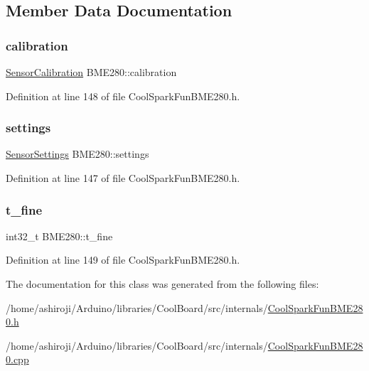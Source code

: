 \subsection{Member Data Documentation}
\mbox{\label{class_b_m_e280_aa7a28484b6f5eb6f43261ea25016fbf8}} 
\subsubsection{\texorpdfstring{calibration}{calibration}}
{\footnotesize\ttfamily \hyperlink{struct_sensor_calibration}{Sensor\+Calibration} B\+M\+E280\+::calibration}



Definition at line 148 of file Cool\+Spark\+Fun\+B\+M\+E280.\+h.

\mbox{\label{class_b_m_e280_af06253eb2f8ad4b5fabb858bc4a973bf}} 
\subsubsection{\texorpdfstring{settings}{settings}}
{\footnotesize\ttfamily \hyperlink{struct_sensor_settings}{Sensor\+Settings} B\+M\+E280\+::settings}



Definition at line 147 of file Cool\+Spark\+Fun\+B\+M\+E280.\+h.

\mbox{\label{class_b_m_e280_ad20f44914b78395f4d4bc64f4a68b369}} 
\subsubsection{\texorpdfstring{t\+\_\+fine}{t\_fine}}
{\footnotesize\ttfamily int32\+\_\+t B\+M\+E280\+::t\+\_\+fine}



Definition at line 149 of file Cool\+Spark\+Fun\+B\+M\+E280.\+h.



The documentation for this class was generated from the following files\+:\begin{DoxyCompactItemize}
\item 
/home/ashiroji/\+Arduino/libraries/\+Cool\+Board/src/internals/\hyperlink{_cool_spark_fun_b_m_e280_8h}{Cool\+Spark\+Fun\+B\+M\+E280.\+h}\item 
/home/ashiroji/\+Arduino/libraries/\+Cool\+Board/src/internals/\hyperlink{_cool_spark_fun_b_m_e280_8cpp}{Cool\+Spark\+Fun\+B\+M\+E280.\+cpp}\end{DoxyCompactItemize}

